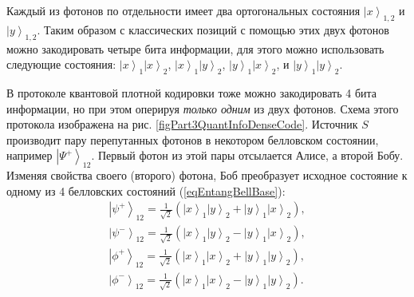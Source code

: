 Каждый из фотонов по отдельности имеет два ортогональных состояния 
$\left|x\right>_{1,2}$ и $\left|y\right>_{1,2}$. Таким образом с
классических позиций с помощью этих двух фотонов можно закодировать
четыре бита информации, для этого можно использовать следующие
состояния:
$\left|x\right>_1 \left|x\right>_2$,
$\left|x\right>_1 \left|y\right>_2$,
$\left|y\right>_1 \left|x\right>_2$,
и 
$\left|y\right>_1 \left|y\right>_2$.



В протоколе квантовой плотной кодировки тоже можно закодировать 4
бита информации, но при этом оперируя {\it только одним} из двух 
фотонов. Схема этого протокола изображена на
рис. \ref{figPart3QuantInfoDenseCode}. Источник $S$ производит пару
перепутанных фотонов в некотором белловском состоянии, например
$\left|\Psi^{+}\right>_{12}$.  Первый фотон из этой пары отсылается Алисе,
а второй Бобу. Изменяя свойства своего (второго) фотона, Боб
преобразует исходное состояние к одному из 4 белловских состояний (\ref{eqEntangBellBase}):
\begin{eqnarray}
  \left|\psi^{+}\right>_{12} = 
  \frac{1}{\sqrt{2}}\left(
  \left|x\right>_1\left|y\right>_2 + 
  \left|y\right>_1\left|x\right>_2
  \right),
  \nonumber \\
  \left|\psi^{-}\right>_{12} = 
  \frac{1}{\sqrt{2}}\left(
  \left|x\right>_1\left|y\right>_2 - 
  \left|y\right>_1\left|x\right>_2
  \right),
  \nonumber \\
  \left|\phi^{+}\right>_{12} = 
  \frac{1}{\sqrt{2}}\left(
  \left|x\right>_1\left|x\right>_2 + 
  \left|y\right>_1\left|y\right>_2
  \right),
  \nonumber \\
  \left|\phi^{-}\right>_{12} = 
  \frac{1}{\sqrt{2}}\left(
  \left|x\right>_1\left|x\right>_2 - 
  \left|y\right>_1\left|y\right>_2
  \right).
  \label{eqQuantInfoBellBase}
\end{eqnarray}

